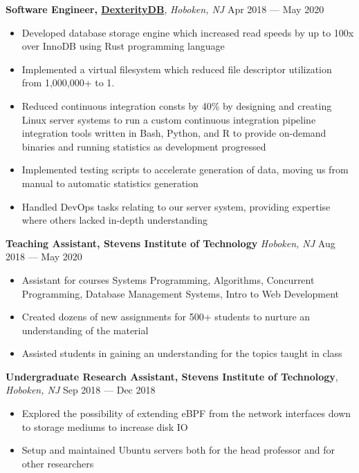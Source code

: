 \documentclass[10pt,letterpaper,roman]{moderncv}
\begin{document}
\textbf{Software Engineer, \href{https://dexteritydb.com}{DexterityDB}},
\textit{Hoboken, NJ} \hfill Apr 2018 --- May 2020
\begin{itemize}
\item Developed database storage engine which increased read speeds by up to 100x over InnoDB using Rust programming language
\item Implemented a virtual filesystem which reduced file descriptor utilization
  from 1,000,000+ to 1.
\item Reduced continuous integration consts by 40\% by designing and creating
  Linux server systems to run a custom continuous integration pipeline
  integration tools written in Bash, Python, and R to provide on-demand binaries
  and running statistics as development progressed
\item Implemented testing scripts to accelerate generation of data, moving us from manual to automatic statistics generation
\item Handled DevOps tasks relating to our server system, providing expertise
  where others lacked in-depth understanding
\end{itemize}\space

\hfill

\textbf{Teaching Assistant, Stevens Institute of Technology} \textit{Hoboken,
  NJ} \hfill Aug 2018 --- May 2020
\begin{itemize}
\item Assistant for courses Systems Programming, Algorithms, Concurrent
  Programming, Database Management Systems, Intro to Web Development
\item Created dozens of new assignments for 500+ students to nurture an
  understanding of the material
\item Assisted students in gaining an understanding for the topics taught in
  class
\end{itemize}

\hfill

\textbf{Undergraduate Research Assistant, Stevens Institute of Technology},
\textit{Hoboken, NJ} \hfill Sep 2018 --- Dec 2018
\begin{itemize}
\item Explored the possibility of extending eBPF from the network interfaces
  down to storage mediums to increase disk IO
\item Setup and maintained Ubuntu servers both for the head professor and for
  other researchers
\end{itemize}
\end{document}
